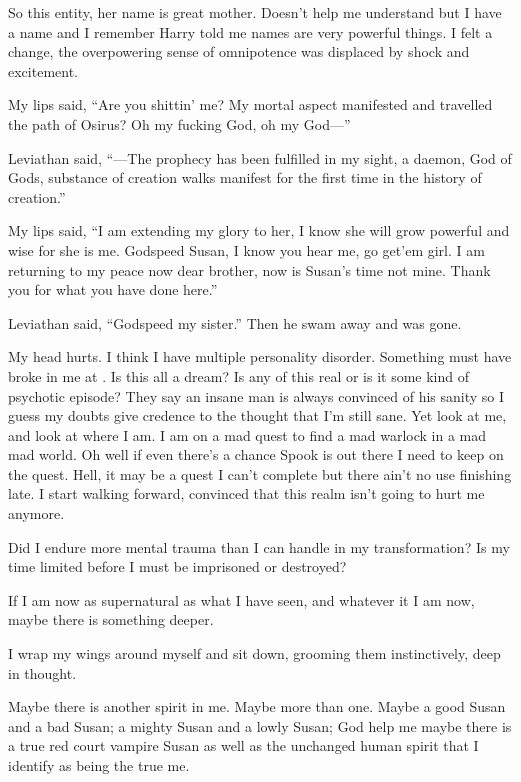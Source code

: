 So this entity, her name is great mother. Doesn't help me understand but I have a name and I remember Harry told me names are very powerful things. I felt a change, the overpowering sense of omnipotence was displaced by shock and excitement.

My lips said, ``Are you shittin' me? My mortal aspect manifested and travelled the path of Osirus? Oh my fucking God, oh my God---''

Leviathan said, ``---The prophecy has been fulfilled in my sight, a daemon, God of Gods, substance of creation walks manifest for the first time in the history of creation.''

My lips said, ``I am extending my glory to her, I know she will grow powerful and wise for she is me. Godspeed Susan, I know you hear me, go get'em girl. I am returning to my peace now dear brother, now is Susan's time not mine. Thank you for what you have done here.''

Leviathan said, ``Godspeed my sister.'' Then he swam away and was gone.

\parasep

My head hurts. I think I have multiple personality disorder. Something must have broke in me at \chichenitza*. Is this all a dream? Is any of this real or is it some kind of psychotic episode? They say an insane man is always convinced of his sanity so I guess my doubts give credence to the thought that I'm still sane. Yet look at me, and look at where I am. I am on a mad quest to find a mad warlock in a mad mad world. Oh well if even there's a chance Spook is out there I need to keep on the quest. Hell, it may be a quest I can't complete but there ain't no use finishing late. I start walking forward, convinced that this realm isn't going to hurt me anymore.

Did I endure more mental trauma than I can handle in my transformation? Is my time limited before I must be imprisoned or destroyed?

If I am now as supernatural as what I have seen, and whatever it I am now, maybe there is something deeper. 

I wrap my wings around myself and sit down, grooming them instinctively, deep in thought.

Maybe there is another spirit in me. Maybe more than one. Maybe a good Susan and a bad Susan; a mighty Susan and a lowly Susan; God help me maybe there is a true red court vampire Susan as well as the unchanged human spirit that I identify as being the true me.

